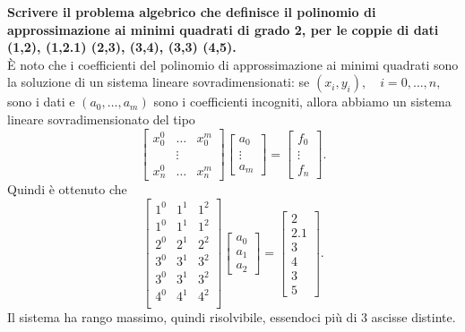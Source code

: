 \begin{example}
	\textbf{Scrivere il problema algebrico che definisce il polinomio di approssimazione ai minimi quadrati di grado 2, per le coppie di dati (1,2), (1,2.1) (2,3), (3,4), (3,3) (4,5).}\\
	È noto che i coefficienti del polinomio di approssimazione ai minimi quadrati sono la soluzione di un sistema lineare sovradimensionati: se $(x_i,y_i),\quad i=0,\hdots,n,$ sono i dati e $(a_0, \hdots, a_m)$ sono i coefficienti incogniti, allora abbiamo un sistema lineare sovradimensionato del tipo
	\begin{equation*}
		\begin{bmatrix}
			x_0^0&\hdots &x_0^m\\
			&\vdots&\\
			x_n^0& \hdots &x_n^m
		\end{bmatrix}
		\begin{bmatrix}
			a_0\\
			\vdots\\
			a_m
		\end{bmatrix} =
		\begin{bmatrix}
			f_0\\
			\vdots\\
			f_n
		\end{bmatrix}.
	\end{equation*}
	Quindi è ottenuto che
	\begin{equation*}
		\begin{bmatrix}
			1^0& 1^1 &1^2\\
			1^0& 1^1 &1^2\\
			2^0& 2^1 & 2^2\\
			3^0& 3^1 & 3^2\\
			3^0& 3^1 & 3^2\\
			4^0& 4^1 & 4^2\\
		\end{bmatrix}
		\begin{bmatrix}
			a_0\\
			a_1\\
			a_2
		\end{bmatrix} =
		\begin{bmatrix}
			2\\
			2.1\\
			3\\
			4\\
			3\\
			5
		\end{bmatrix}.
	\end{equation*}
	Il sistema ha rango massimo, quindi risolvibile, essendoci più di 3 ascisse distinte.
\end{example}

